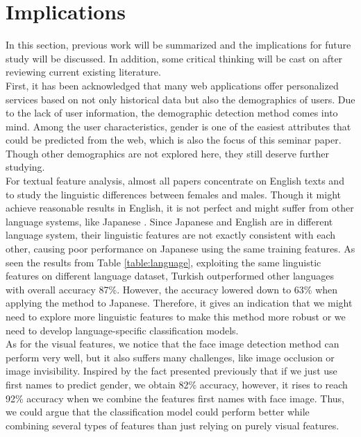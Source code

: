 \documentclass[runningheads]{llncs}
\begin{document}
	\section{Implications}
	
	In this section, previous work will be summarized and the implications for future study will be discussed. In addition, some critical thinking will be cast on after reviewing current existing literature. \\
	
	First, it has been acknowledged that many web applications offer personalized services based on not only historical data but also the demographics of users. Due to the lack of user information, the demographic detection method comes into mind. Among the user characteristics, gender is one of the easiest attributes that could be predicted from the web, which is also the focus of this seminar paper. Though other demographics are not explored here, they still deserve further studying. \\
	
	For textual feature analysis, almost all papers concentrate on English texts and to study the linguistic differences between females and males. Though it might achieve reasonable results in English, it is not perfect and might suffer from other language systems, like Japanese \cite{ciot2013gender}. Since Japanese and English are in different language system, their linguistic features are not exactly consistent with each other, causing poor performance on Japanese using the same training features. As seen the results from Table \ref{table:language}, exploiting the same linguistic features on different language dataset, Turkish outperformed other languages with overall accuracy 87\%. However, the accuracy lowered down to 63\% when applying the method to Japanese. Therefore, it gives an indication that we might need to explore more linguistic features to make this method more robust or we need to develop language-specific classification models. \\
	
	As for the visual features, we notice that the face image detection method can perform very well, but it also suffers many challenges, like image occlusion or image invisibility. Inspired by the fact presented previously that if we just use first names to predict gender, we obtain 82\% accuracy, however, it rises to reach 92\% accuracy when we combine the features first names with face image. Thus, we could argue that the classification model could perform better while combining several types of features than just relying on purely visual features. \\
	
\end{document}
